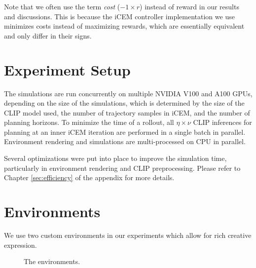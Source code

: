 Note that we often use the term \emph{cost} (\(-1 \times r\)) instead of reward in our results and discussions. This is because the iCEM controller implementation we use minimizes costs instead of maximizing rewards, which are essentially equivalent and only differ in their signs.

\section{Experiment Setup}
\label{sec:experiment-setup}

The simulations are run concurrently on multiple NVIDIA V100 and A100 GPUs, depending on the size of the simulations, which is determined by the size of the CLIP model used, the number of trajectory samples in iCEM, and the number of planning horizons.
To minimize the time of a rollout, all \(\eta \times \nu\) CLIP inferences for planning at an inner iCEM iteration are performed in a single batch in parallel.
Environment rendering and simulations are multi-processed on CPU in parallel.

Several optimizations were put into place to improve the simulation time, particularly in environment rendering and CLIP preprocessing.
Please refer to Chapter \ref{sec:efficiency} of the appendix for more details.

\section{Environments}
\label{sec:environments}
We use two custom environments in our experiments which allow for rich creative expression.

\begin{figure}[H]
    \centering
    \qquad
    \caption{The environments.}
    \label{fig:environments}
\end{figure}

